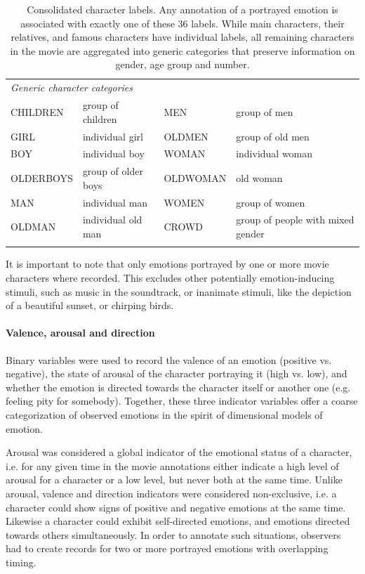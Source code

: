 \documentclass[10pt,a4paper,twocolumn]{article}
\begin{document}
\begin{table}
\begin{tabular}{p{4cm}p{4cm}p{3.6cm}p{4cm}}
\multicolumn{4}{l}{\textit{Generic character categories}} \\
CHILDREN  & group of children & MEN      & group of men \\
GIRL      & individual girl & OLDMEN   & group of old men \\
BOY       & individual boy & WOMAN    & individual woman \\
OLDERBOYS & group of older boys & OLDWOMAN & old woman\\
MAN       & individual man & WOMEN    & group of women \\
OLDMAN    & individual old man & CROWD    & group of people with mixed gender \\
 \\\hline
  \end{tabular}
  \caption{Consolidated character labels. Any annotation of a portrayed emotion
  is associated with exactly one of these 36 labels. While main characters,
  their relatives, and famous characters have individual labels, all remaining
  characters in the movie are aggregated into generic categories that preserve
  information on gender, age group and number.}
  \label{tab:characters}
\end{table}

It is important to note that only emotions portrayed by one or more movie
characters where recorded. This excludes other potentially emotion-inducing
stimuli, such as music in the soundtrack, or inanimate stimuli, like the
depiction of a beautiful sunset, or chirping birds.

\paragraph{Valence, arousal and direction}

Binary variables were used to record the valence of an emotion (positive vs.
negative), the state of arousal of the character portraying it (high vs. low),
and whether the emotion is directed towards the character itself or another one
(e.g. feeling pity for somebody). Together, these three indicator variables
offer a coarse categorization of observed emotions in the spirit of dimensional
models of emotion.

Arousal was considered a global indicator of the emotional status of a
character, i.e. for any given time in the movie annotations either indicate a
high level of arousal for a character or a low level, but never both at the
same time. Unlike arousal, valence and direction indicators were considered
non-exclusive, i.e. a character could show signs of positive and negative
emotions at the same time. Likewise a character could exhibit self-directed
emotions, and emotions directed towards others simultaneously. In order to
annotate such situations, observers had to create records for two or more
portrayed emotions with overlapping timing.
\end{document}
